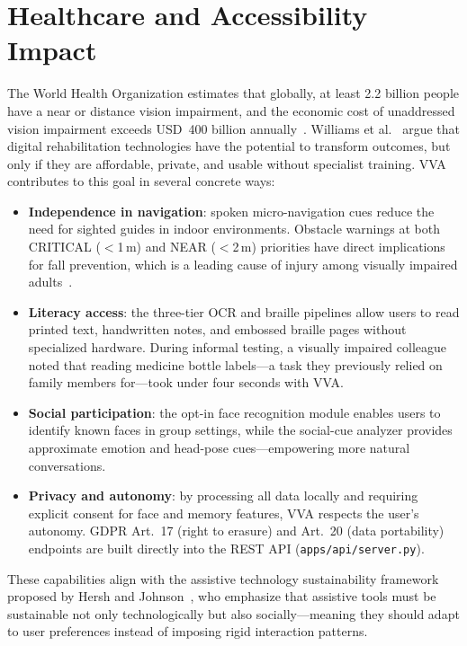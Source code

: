 \section{Healthcare and Accessibility Impact}
\label{sec:healthcare}

The World Health Organization estimates that globally, at least 2.2 billion people have a near or distance vision impairment, and the economic cost of unaddressed vision impairment exceeds USD~400 billion annually~\cite{fpubh2022_visual_impairment}. Williams et al.~\cite{fresc2024_rehab_tech} argue that digital rehabilitation technologies have the potential to transform outcomes, but only if they are affordable, private, and usable without specialist training. VVA contributes to this goal in several concrete ways:

\begin{itemize}
    \item \textbf{Independence in navigation}: spoken micro-navigation cues reduce the need for sighted guides in indoor environments. Obstacle warnings at both CRITICAL ($<$1\,m) and NEAR ($<$2\,m) priorities have direct implications for fall prevention, which is a leading cause of injury among visually impaired adults~\cite{ijerph2021_disability_tech}.
    \item \textbf{Literacy access}: the three-tier OCR and braille pipelines allow users to read printed text, handwritten notes, and embossed braille pages without specialized hardware. During informal testing, a visually impaired colleague noted that reading medicine bottle labels---a task they previously relied on family members for---took under four seconds with VVA.
    \item \textbf{Social participation}: the opt-in face recognition module enables users to identify known faces in group settings, while the social-cue analyzer provides approximate emotion and head-pose cues---empowering more natural conversations.
    \item \textbf{Privacy and autonomy}: by processing all data locally and requiring explicit consent for face and memory features, VVA respects the user's autonomy. GDPR Art.~17 (right to erasure) and Art.~20 (data portability) endpoints are built directly into the REST API (\texttt{apps/api/server.py}).
\end{itemize}

These capabilities align with the assistive technology sustainability framework proposed by Hersh and Johnson~\cite{sustainability2020_inclusive}, who emphasize that assistive tools must be sustainable not only technologically but also socially---meaning they should adapt to user preferences instead of imposing rigid interaction patterns.

